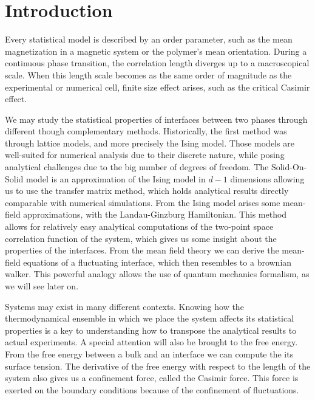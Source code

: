 \chapter*{Introduction}

Every statistical model is described by an order parameter, such as the mean magnetization in a magnetic system or the polymer's mean orientation. During a continuous phase transition, the correlation length diverges up to a macroscopical scale. When this length scale becomes as the same order of magnitude as the experimental or numerical cell, finite size effect arises, such as the critical Casimir effect.

We may study the statistical properties of interfaces between two phases through different though complementary methods. Historically, the first method was through lattice models, and more precisely the Ising model. Those models are well-suited for numerical analysis due to their discrete nature, while posing analytical challenges due to the big number of degrees of freedom. The Solid-On-Solid model is an approximation of the Ising model in $d-1$ dimensions allowing us to use the transfer matrix method, which holds analytical results directly comparable with numerical simulations.
From the Ising model arises some mean-field approximations, with the Landau-Ginzburg Hamiltonian. This method allows for relatively easy analytical computations of the two-point space correlation function of the system, which gives us some insight about the properties of the interfaces. 
From the mean field theory we can derive the mean-field equations of a fluctuating interface, which then resembles to a brownian walker. This powerful analogy allows the use of quantum mechanics formalism, as we will see later on.

Systems may exist in many different contexts. Knowing how the thermodynamical ensemble in which we place the system affects its statistical properties is a key to understanding how to transpose the analytical results to actual experiments. 
A special attention will also be brought to the free energy. From the free energy between a bulk and an interface we can compute the its surface tension. The derivative of the free energy with respect to the length of the system also gives us a confinement force, called the Casimir force. This force is exerted on the boundary conditions because of the confinement of fluctuations. 

